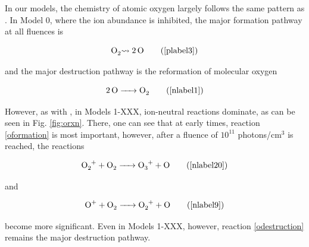\documentclass[journal=aesccq,manuscript=draft]{achemso}
\begin{document}
In our models, the chemistry of atomic oxygen largely follows the same pattern as . In Model 0, where the ion abundance is inhibited, the major formation pathway at all fluences is

\begin{equation}
    \ce{O2 \leadsto{} 2O}
    \tag{\ref{plabel3}}
    \label{oformation}
\end{equation}

\noindent
and the major destruction pathway is the reformation of molecular oxygen

\begin{equation}
    \ce{2O -> O2}
    \tag{\ref{nlabel1}}
    \label{odestruction}
\end{equation}

\noindent
However, as with , in Models 1-XXX, ion-neutral reactions dominate, as can be seen in Fig. \ref{fig:orxn}. There, one can see that at early times, reaction \eqref{oformation} is most important, however, after a fluence of $10^{11}$ photons/cm$^{3}$ is reached, the reactions

\begin{equation}
    \ce{O2+ + O2 -> O3+ + O}
    \tag{\ref{nlabel20}}
    \label{otwoiondest}
\end{equation}

\noindent
and

\begin{equation}
    \ce{O+ + O2 -> O2+ + O}
    \tag{\ref{nlabel9}}
\end{equation}

\noindent
become more significant. Even in Models 1-XXX, however, reaction \eqref{odestruction} remains the major destruction pathway. 

\subsubsection{}
\end{document}

